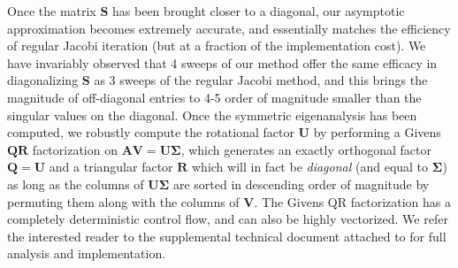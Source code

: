 Once the matrix $\mathbf{S}$ has been brought closer to a diagonal, our asymptotic approximation becomes extremely accurate, and essentially matches the efficiency of regular Jacobi
iteration (but at a fraction of the implementation cost). We have invariably observed that 4 sweeps of our method offer the same efficacy in diagonalizing $\mathbf{S}$ as 3 sweeps of the
regular Jacobi method, and this brings the magnitude of off-diagonal entries to 4-5 order of magnitude smaller than the singular values on the diagonal. Once the symmetric eigenanalysis
has been computed, we robustly compute the rotational factor $\mathbf{U}$ by performing a Givens $\mathbf{QR}$ factorization on $\mathbf{AV}=\mathbf{U\Sigma}$, which generates an exactly
orthogonal factor $\mathbf{Q}=\mathbf{U}$ and a triangular factor $\mathbf{R}$ which will in fact be \emph{diagonal} (and equal to $\mathbf{\Sigma}$) as long as the columns of
$\mathbf{U\Sigma}$ are sorted in descending order of magnitude by permuting them along with the columns of $\mathbf{V}$. The Givens QR factorization has a completely deterministic
control flow, and can also be highly vectorized. We refer the interested reader
to the supplemental technical document attached to \cite{mcadams:2011:elasticity} for full analysis and implementation.


